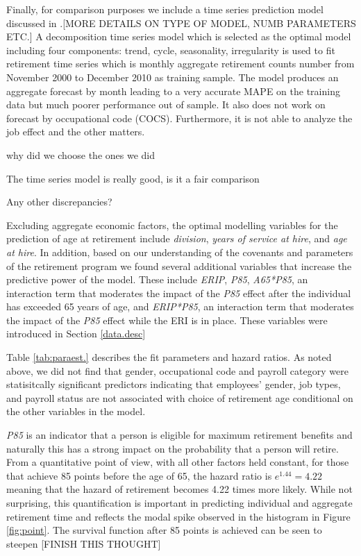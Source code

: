 \documentclass[12pt,letterpaper]{article}
\begin{document}
Finally, for comparison purposes we include a time series prediction model discussed in \cite{zhu2015}.[MORE DETAILS ON TYPE OF MODEL, NUMB PARAMETERS ETC.] A decomposition time series model which is selected as the optimal model including four components: trend, cycle, seasonality, irregularity is used to fit retirement time series which is monthly aggregate retirement counts number from November 2000 to December 2010 as training sample. The model produces an aggregate forecast by month leading to a very accurate MAPE on the training data but much poorer performance out of sample. It also does not work on forecast by occupational code (COCS). Furthermore, it is not able to analyze the job effect and the other matters.

why did we choose the ones we did

The time series model is really good, is it a fair comparison

Any other discrepancies?

Excluding aggregate economic factors, the optimal modelling variables for the prediction of age at retirement include {\it division}, {\it years of service at hire}, and {\it age at hire}.  In addition, based on our understanding of the covenants and parameters of the retirement program we found several additional variables that increase the predictive power of the model. These include {\it ERIP}, {\it P85}, {\it A65*P85}, an interaction term that moderates the impact of the {\it P85} effect after the individual has exceeded 65 years of age, and  {\it ERIP*P85}, an interaction term that moderates the impact of the {\it P85} effect while the ERI is in place.  These variables were introduced in Section \ref{data.desc}

Table \ref{tab:paraest.} describes the fit parameters and hazard ratios.  As noted above, we did not find that gender, occupational code and payroll category were statisitcally significant predictors indicating that employees' gender, job types, and payroll status are not associated with choice of retirement age conditional on the other variables in the model.

{\it P85} is an indicator that a person is eligible for maximum retirement benefits and naturally this has a strong impact on the probability that a person will retire.  From a quantitative point of view, with all other factors held constant, for those that achieve 85 points before the age of 65, the hazard ratio is $e^{1.44} = 4.22$ meaning that the hazard of retirement becomes 4.22 times more likely.  While not surprising, this quantification is important in predicting individual and aggregate retirement time and reflects the modal spike observed in the histogram in Figure \ref{fig:point}.  The survival function after 85 points is achieved can be seen to steepen [FINISH THIS THOUGHT] 
\end{document}
